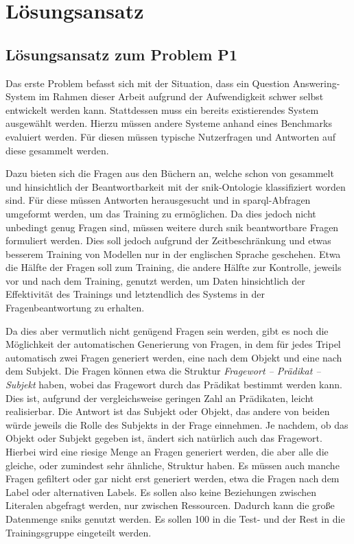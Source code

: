 \chapter{Lösungsansatz}\label{ch:approach}

\section{Lösungsansatz zum Problem P1}

Das erste Problem befasst sich mit der Situation, dass ein Question Answering-System im Rahmen dieser Arbeit aufgrund der Aufwendigkeit schwer selbst entwickelt werden kann.
Stattdessen muss ein bereits existierendes System ausgewählt werden.
Hierzu müssen andere Systeme anhand eines Benchmarks evaluiert werden.
Für diesen müssen typische Nutzerfragen und Antworten auf diese gesammelt werden.

Dazu bieten sich die Fragen aus den Büchern an, welche schon von \citet{arneba} gesammelt und hinsichtlich der Beantwortbarkeit mit der \ac{snik}-Ontologie klassifiziert worden sind.
Für diese müssen Antworten herausgesucht und in \ac{sparql}-Abfragen umgeformt werden, um das Training zu ermöglichen.
Da dies jedoch nicht unbedingt genug Fragen sind, müssen weitere durch \ac{snik} beantwortbare Fragen formuliert werden.
Dies soll jedoch aufgrund der Zeitbeschränkung und etwas besserem Training von Modellen nur in der englischen Sprache geschehen.
Etwa die Hälfte der Fragen soll zum Training, die andere Hälfte zur Kontrolle, jeweils vor und nach dem Training, genutzt werden,
um Daten hinsichtlich der Effektivität des Trainings und letztendlich des Systems in der Fragenbeantwortung zu erhalten.

Da dies aber vermutlich nicht genügend Fragen sein werden, gibt es noch die Möglichkeit der automatischen Generierung von Fragen, in dem für jedes Tripel automatisch zwei Fragen generiert werden,
eine nach dem Objekt und eine nach dem Subjekt.
Die Fragen können etwa die Struktur \emph{Fragewort -- Prädikat -- Subjekt} haben, wobei das Fragewort durch das Prädikat bestimmt werden kann.
Dies ist, aufgrund der vergleichsweise geringen Zahl an Prädikaten, leicht realisierbar.
Die Antwort ist das Subjekt oder Objekt, das andere von beiden würde jeweils die Rolle des Subjekts in der Frage einnehmen.
Je nachdem, ob das Objekt oder Subjekt gegeben ist, ändert sich natürlich auch das Fragewort.
Hierbei wird eine riesige Menge an Fragen generiert werden, die aber alle die gleiche, oder zumindest sehr ähnliche, Struktur haben.
Es müssen auch manche Fragen gefiltert oder gar nicht erst generiert werden, etwa die Fragen nach dem Label oder alternativen Labels.
Es sollen also keine Beziehungen zwischen Literalen abgefragt werden, nur zwischen Ressourcen.
Dadurch kann die große Datenmenge \ac{snik}s genutzt werden.
Es sollen 100 in die Test- und der Rest in die Trainingsgruppe eingeteilt werden.

